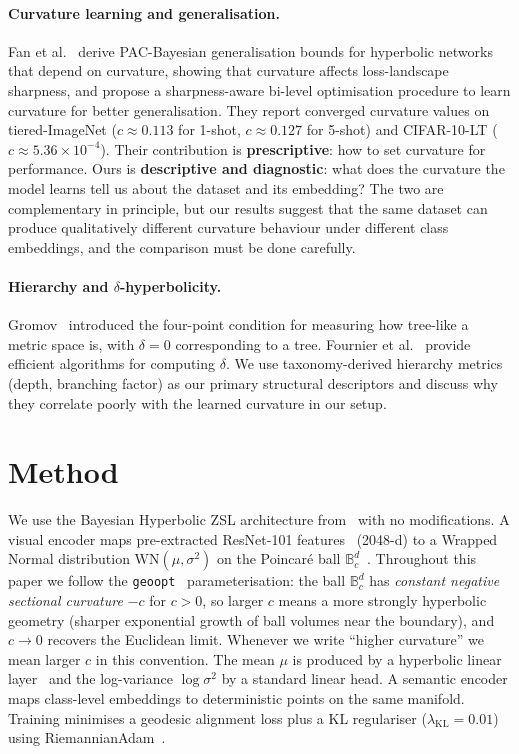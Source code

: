 \documentclass{article}
\newcommand{\poinc}{\mathbb{B}^{d}_{c}}
\DeclareMathOperator{\KL}{KL}
\begin{document}
\paragraph{Curvature learning and generalisation.}
Fan et al.~\cite{fan2025curvature} derive PAC-Bayesian generalisation bounds for hyperbolic networks that depend on curvature, showing that curvature affects loss-landscape sharpness, and propose a sharpness-aware bi-level optimisation procedure to learn curvature for better generalisation.
They report converged curvature values on tiered-ImageNet ($c \approx 0.113$ for 1-shot, $c \approx 0.127$ for 5-shot) and CIFAR-10-LT ($c \approx 5.36 \times 10^{-4}$).
Their contribution is \textbf{prescriptive}: how to set curvature for performance.
Ours is \textbf{descriptive and diagnostic}: what does the curvature the model learns tell us about the dataset and its embedding?
The two are complementary in principle, but our results suggest that the same dataset can produce qualitatively different curvature behaviour under different class embeddings, and the comparison must be done carefully.

\paragraph{Hierarchy and $\delta$-hyperbolicity.}
Gromov~\cite{gromov1987hyperbolic} introduced the four-point condition for measuring how tree-like a metric space is, with $\delta = 0$ corresponding to a tree.
Fournier et al.~\cite{fournier2015hyperbolicity} provide efficient algorithms for computing $\delta$.
We use taxonomy-derived hierarchy metrics (depth, branching factor) as our primary structural descriptors and discuss why they correlate poorly with the learned curvature in our setup.

\section{Method}\label{sec:method}

We use the Bayesian Hyperbolic ZSL architecture from~\cite{bejleri2025bayesian} with no modifications.
A visual encoder maps pre-extracted ResNet-101 features~\cite{he2016resnet} (2048-d) to a Wrapped Normal distribution $\mathrm{WN}(\mu, \sigma^2)$ on the Poincar\'{e} ball $\poinc$~\cite{nagano2019wrapped}.
Throughout this paper we follow the \texttt{geoopt}~\cite{kochurov2020geoopt} parameterisation: the ball $\poinc$ has \emph{constant negative sectional curvature} $-c$ for $c > 0$, so larger $c$ means a more strongly hyperbolic geometry (sharper exponential growth of ball volumes near the boundary), and $c \to 0$ recovers the Euclidean limit.
Whenever we write ``higher curvature'' we mean larger $c$ in this convention.
The mean $\mu$ is produced by a hyperbolic linear layer~\cite{ganea2018hyperbolic} and the log-variance $\log \sigma^2$ by a standard linear head.
A semantic encoder maps class-level embeddings to deterministic points on the same manifold.
Training minimises a geodesic alignment loss plus a KL regulariser ($\lambda_{\KL} = 0.01$) using RiemannianAdam~\cite{becigneul2019riemannian}.
\end{document}
